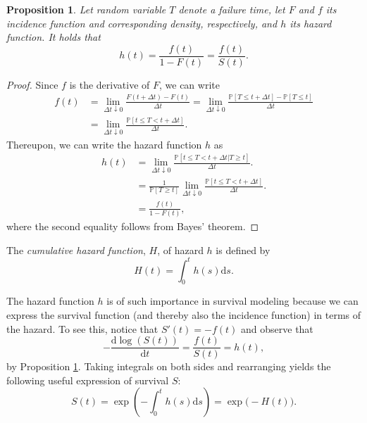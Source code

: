 \documentclass[11pt]{article}
\renewcommand{\P}{\mathbb{P}}
\renewcommand{\d}{\text{d}}
\newtheorem{proposition}[theorem]{Proposition}
\begin{document}
\begin{proposition} \label{prop:hazard}
Let random variable $T$ denote a failure time, let $F$ and $f$ its incidence function and corresponding density, respectively, and $h$ its hazard function. It holds that
\[
	h(t) = \frac{f(t)}{1 - F(t)} = \frac{f(t)}{S(t)}.
\]
\end{proposition}
\begin{proof}
Since $f$ is the derivative of $F$, we can write
\begin{align*}
	f(t) 
	&=
	\lim_{\Delta t\downarrow 0} \frac{F(t + \Delta t) - F(t)}{\Delta t}
	=
	\lim_{\Delta t\downarrow 0} \frac{\P[ T \leq t + \Delta t] - \P[T \leq t]}{\Delta t}
	\\
	&=
	\lim_{\Delta t\downarrow 0} \frac{\P[t \leq T < t + \Delta t]}{\Delta t}.
\end{align*}
Thereupon, we can write the hazard function $h$ as
\begin{align*}
	h(t) 
	&=
	\lim_{\Delta t\downarrow 0}\frac{\P[t \leq T < t + \Delta t| T \geq t]}{\Delta t}.
	\\
	&=
	\frac{1}{\P[T \geq t]}
	\lim_{\Delta t\downarrow 0} \frac{\P[t \leq T < t + \Delta t]}{\Delta t}.
	\\
	&=
	\frac{f(t)}{1 - F(t)},
\end{align*}
where the second equality follows from Bayes' theorem.
\end{proof}

The \textit{cumulative hazard function}, $H$, of hazard $h$ is defined by
\[
    H(t) = \int_0^t h(s) \d s.
\]

The hazard function $h$ is of such importance in survival modeling because we can express the survival function (and thereby also the incidence function) in terms of the hazard. To see this, notice that $S'(t) = -f(t)$ and observe that
\[
	- \frac{\d \log(S(t))}{\d t} = \frac{f(t)}{S(t)} = h(t),
\]
by Proposition \ref{prop:hazard}. Taking integrals on both sides and rearranging yields the following useful expression of survival $S$:
\[
	S(t) = \exp \left( - \int_0^t h(s) \d s \right) = \exp \big( - H(t) \big).
\]
\end{document}
